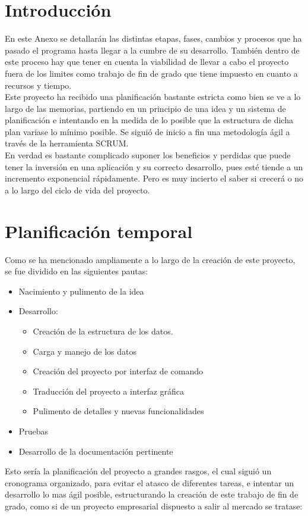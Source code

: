 
\section{Introducción}
En este Anexo se detallarán las distintas etapas, fases, cambios y procesos que ha pasado el programa hasta llegar a la cumbre de su desarrollo. También dentro de este proceso hay que tener en cuenta la viabilidad de llevar a cabo el proyecto fuera de los limites como trabajo de fin de grado que tiene impuesto en cuanto a recursos y tiempo.
\\
Este proyecto ha recibido una planificación bastante estricta como bien se ve a lo largo de las memorias, partiendo en un principio de una idea y un sistema de planificación e intentando en la medida de lo posible que la estructura de dicha plan variase lo mínimo posible. Se siguió de inicio a fin una metodología ágil a través de la herramienta SCRUM.
\\
En verdad es bastante complicado suponer los beneficios y perdidas que puede tener la inversión en una aplicación y su correcto desarrollo, pues esté tiende a un incremento exponencial rápidamente. Pero es muy incierto el saber si crecerá o no a lo largo del ciclo de vida del proyecto.
\section{Planificación temporal}
Como se ha mencionado ampliamente a lo largo de la creación de este proyecto, se fue dividido en las siguientes pautas:
\begin{itemize}
\item Nacimiento y pulimento de la idea
\item Desarrollo:
\begin{itemize}
\item Creación de la estructura de los datos.
\item Carga y manejo de los datos
\item Creación del proyecto por interfaz de comando
\item Traducción del proyecto a interfaz gráfica
\item Pulimento de detalles y nuevas funcionalidades
\end{itemize}
\item Pruebas
\item Desarrollo de la documentación pertinente
\end{itemize}
Esto sería la planificación del proyecto a grandes rasgos, el cual siguió un cronograma organizado, para evitar el atasco de diferentes tareas, e intentar un desarrollo lo mas ágil posible, estructurando la creación de este trabajo de fin de grado, como si de un proyecto empresarial dispuesto a salir al mercado se tratase:

